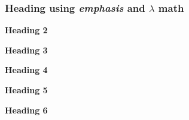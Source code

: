 \begin{frame}[t]
\frametitle{Heading using \emph{emphasis} and $\lambda$ math}

\end{frame}

\begin{frame}[t]
\par\medskip\noindent\textbf{Heading 2}\par

\par\medskip\noindent\textbf{Heading 3}\par

\par\medskip\noindent\textbf{Heading 4}\par

\par\medskip\noindent\textbf{Heading 5}\par

\par\medskip\noindent\textbf{Heading 6}\par


\end{frame}

